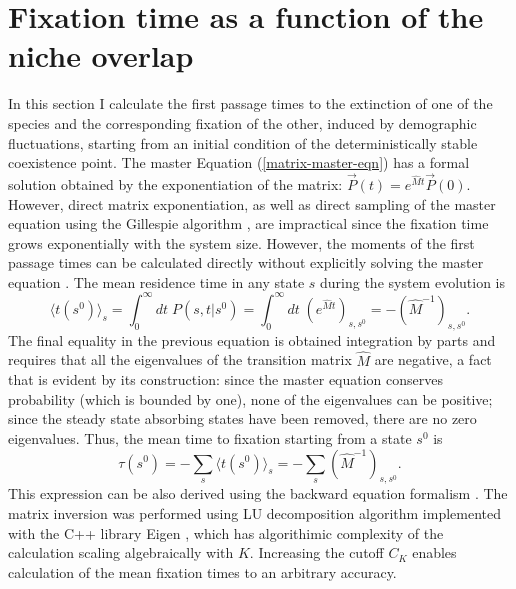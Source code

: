 \section{Fixation time as a function of the niche overlap}
In this section I calculate the first passage times to the extinction of one of the species and the corresponding fixation of the other, induced by demographic fluctuations, starting from an initial condition of the deterministically stable coexistence point. 
The master Equation (\ref{matrix-master-eqn}) has a formal solution obtained by the exponentiation of the matrix: $\vec{P}(t) = e^{\hat{M} t}\vec{P}(0)$. 
However, direct matrix exponentiation, as well as direct sampling of the master equation using the Gillespie algorithm \cite{Gillespie1977,Cao2006}, are impractical since the fixation time grows exponentially with the system size. %
However, the moments of the first passage times can be calculated directly without explicitly solving the master equation \cite{Grinstead2003}. 
The mean residence time in any state $s$ during the system evolution is
\begin{equation}
\langle t(s^0)\rangle_s=\int_0^\infty dt\; P(s,t|s^0)=\int_0^\infty dt \; (e^{\hat{M}t})_{s,s^0}=-(\hat{M}^{-1})_{s,s^0}. \label{residence-time}
\end{equation}
The final equality in the previous equation is obtained integration by parts and requires that all the eigenvalues of the transition matrix $\hat{M}$ are negative, a fact that is evident by its construction: since the master equation conserves probability (which is bounded by one), none of the eigenvalues can be positive; since the steady state absorbing states have been removed, there are no zero eigenvalues. 
Thus, the mean time to fixation starting from a state $s^0$ is \cite{Iyer-Biswas2015}
\begin{equation} \label{explicit-tau}
\tau(s^0) =-\sum_s\langle t(s^0)\rangle_s=-\sum_s \left(\hat{M}^{-1}\right)_{s,s^0}.
\end{equation}
This expression can be also derived using the backward equation formalism \cite{Iyer-Biswas2015}.
The matrix inversion was performed using LU decomposition algorithm implemented with the C++ library Eigen \cite{eigenweb}, which has algorithimic complexity of the calculation scaling algebraically with $K$.
Increasing the cutoff $C_K$ enables calculation of the mean fixation times to an arbitrary accuracy.

